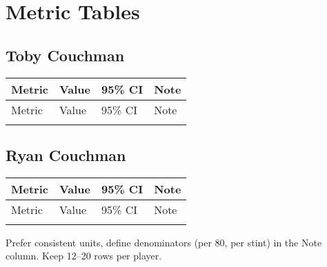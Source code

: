 \section{Metric Tables}

\subsection{Toby Couchman}
\begin{longtable}{L{3.6cm} C{2.3cm} C{3.6cm} L{5.5cm}}
\toprule
Metric & Value & 95\% CI & Note\\
\midrule
\endfirsthead
\toprule
Metric & Value & 95\% CI & Note\\
\midrule
\endhead
\bottomrule
\endfoot

\end{longtable}

\subsection{Ryan Couchman}
\begin{longtable}{L{3.6cm} C{2.3cm} C{3.6cm} L{5.5cm}}
\toprule
Metric & Value & 95\% CI & Note\\
\midrule
\endfirsthead
\toprule
Metric & Value & 95\% CI & Note\\
\midrule
\endhead
\bottomrule
\endfoot

\end{longtable}

\begin{coachnotes}
Prefer consistent units, define denominators (per 80, per stint) in the Note column. Keep 12–20 rows per player.
\end{coachnotes}
